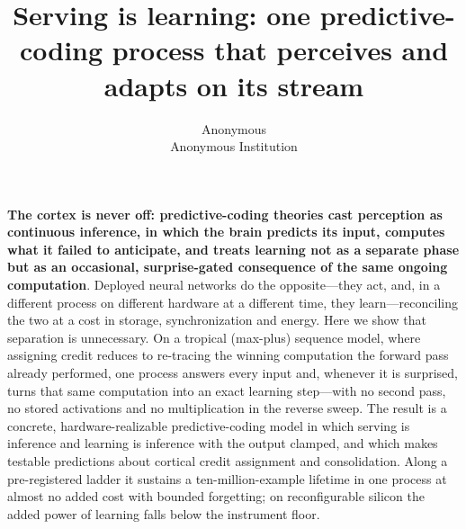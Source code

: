 \documentclass[11pt]{article}
\title{\vspace{-2.2em}\bfseries Serving is learning: one predictive-coding
process that perceives and adapts on its stream}
\author{Anonymous\\[-0.2em]\small Anonymous Institution}
\date{}
\begin{document}
\maketitle
\vspace{-2.6em}

\noindent\textbf{The cortex is never off: predictive-coding theories cast
perception as continuous inference, in which the brain predicts its input,
computes what it failed to anticipate, and treats learning not as a separate
phase but as an occasional, surprise-gated consequence of the same ongoing
computation}\cite{rao1999predictive,friston2010free,keller2018predictive}.
Deployed neural networks do the opposite---they act, and, in a different process
on different hardware at a different time, they learn---reconciling the two at a
cost in storage, synchronization and energy\cite{espeholt2018impala}. Here we
show that separation is unnecessary. On a tropical (max-plus) sequence model,
where assigning credit reduces to re-tracing the winning computation the forward
pass already performed, one process answers every input and, whenever it is
surprised, turns that same computation into an exact learning step---with no
second pass, no stored activations and no multiplication in the reverse sweep.
The result is a concrete, hardware-realizable predictive-coding model in which
serving is inference and learning is inference with the output clamped, and
which makes testable predictions about cortical credit assignment and
consolidation. Along a pre-registered ladder it sustains a ten-million-example
lifetime in one process at almost no added cost with bounded forgetting; on
reconfigurable silicon the added power of learning falls below the instrument
floor.
\end{document}
